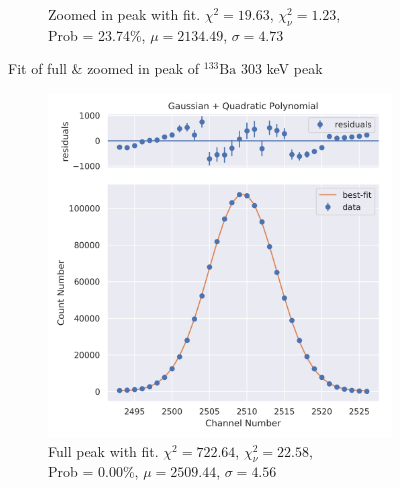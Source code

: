 \documentclass[11pt,a4paper]{article}
\newcommand{\element}[2]{$^{#2}\textrm{#1}$}
\begin{document}
\begin{figure}[H]
\begin{subfigure}{.5\linewidth}
    \caption{Zoomed in peak with fit. $\chi^2 = 19.63$, $\chi^2_\nu = 1.23$, \\ Prob = 23.74\%, $\mu = 2134.49$, $\sigma = 4.73$}
  \end{subfigure}
  \caption{Fit of full \& zoomed in peak of \element{Ba}{133} 303 keV peak}
\end{figure}
\begin{figure}[H]
  \centering
  \begin{subfigure}{.5\linewidth}
    \centering
    \includegraphics[width=\linewidth]{./Images/Barium133/Quad/Quad_6_Full.png}
    \caption{Full peak with fit. $\chi^2 = 722.64$, $\chi^2_\nu = 22.58$, \\ Prob = 0.00\%, $\mu = 2509.44$, $\sigma = 4.56$}
  \end{subfigure}%
  \begin{subfigure}{.5\linewidth}
    \centering

\end{subfigure}
\end{figure}
\end{document}
